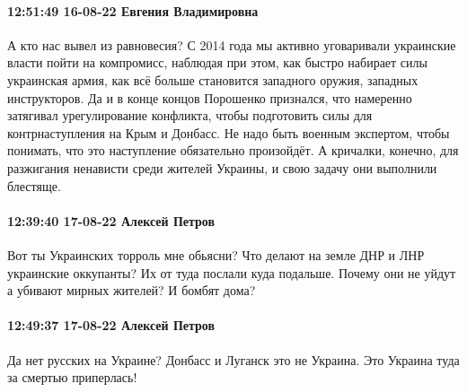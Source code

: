  
 
 
 
 

\paragraph{12:51:49 16-08-22 Евгения Владимировна}

А кто нас вывел из равновесия? С 2014 года мы активно уговаривали украинские
власти пойти на компромисс, наблюдая при этом, как быстро набирает силы
украинская армия, как всё больше становится западного оружия, западных
инструкторов. Да и в конце концов Порошенко признался, что намеренно затягивал
урегулирование конфликта, чтобы подготовить силы для контрнаступления на Крым и
Донбасс. Не надо быть военным экспертом, чтобы понимать, что это наступление
обязательно произойдёт. А кричалки, конечно, для разжигания ненависти среди
жителей Украины, и свою задачу они выполнили блестяще.

\paragraph{12:39:40 17-08-22 Алексей Петров}

Вот ты Украинских торроль мне обьясни? Что делают на земле ДНР и ЛНР украинские
оккупанты? Их от туда послали куда подальше. Почему они не уйдут а убивают
мирных жителей? И бомбят дома?

\paragraph{12:49:37 17-08-22 Алексей Петров}

Да нет русских на Украине? Донбасс и Луганск это не Украина. Это Украина туда
за смертью приперлась!
